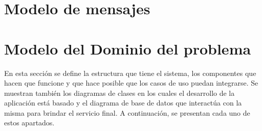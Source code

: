 \documentclass[oneside,10pt]{book}
\begin{document}
\chapter{Modelo de mensajes}


\chapter{Modelo del Dominio del problema}

\noindent
En esta sección se define la estructura que tiene el sistema, los componentes que hacen que
funcione y que hace posible que los casos de uso puedan integrarse. Se muestran también los
diagramas de clases en los cuales el desarrollo de la aplicación está basado y el diagrama de 
base de datos que interactúa con la misma para brindar el servicio final. 
A continuación, se presentan cada uno de estos apartados.




\end{document}

